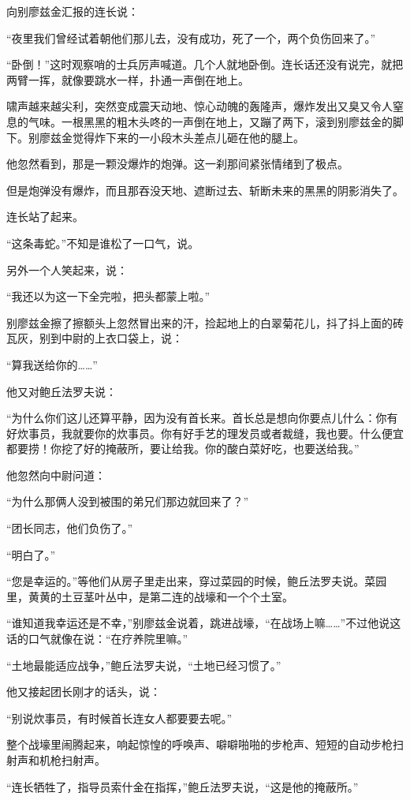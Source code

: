 向别廖兹金汇报的连长说：

“夜里我们曾经试着朝他们那儿去，没有成功，死了一个，两个负伤回来了。”

“卧倒！”这时观察哨的士兵厉声喊道。几个人就地卧倒。连长话还没有说完，就把两臂一挥，就像要跳水一样，扑通一声倒在地上。

啸声越来越尖利，突然变成震天动地、惊心动魄的轰隆声，爆炸发出又臭又令人窒息的气味。一根黑黑的粗木头咚的一声倒在地上，又蹦了两下，滚到别廖兹金的脚下。别廖兹金觉得炸下来的一小段木头差点儿砸在他的腿上。

他忽然看到，那是一颗没爆炸的炮弹。这一刹那间紧张情绪到了极点。

但是炮弹没有爆炸，而且那吞没天地、遮断过去、斩断未来的黑黑的阴影消失了。

连长站了起来。

“这条毒蛇。”不知是谁松了一口气，说。

另外一个人笑起来，说：

“我还以为这一下全完啦，把头都蒙上啦。”

别廖兹金擦了擦额头上忽然冒出来的汗，捡起地上的白翠菊花儿，抖了抖上面的砖瓦灰，别到中尉的上衣口袋上，说：

“算我送给你的……”

他又对鲍丘法罗夫说：

“为什么你们这儿还算平静，因为没有首长来。首长总是想向你要点儿什么：你有好炊事员，我就要你的炊事员。你有好手艺的理发员或者裁缝，我也要。什么便宜都要捞！你挖了好的掩蔽所，要让给我。你的酸白菜好吃，也要送给我。”

他忽然向中尉问道：

“为什么那俩人没到被围的弟兄们那边就回来了？”

“团长同志，他们负伤了。”

“明白了。”

“您是幸运的。”等他们从房子里走出来，穿过菜园的时候，鲍丘法罗夫说。菜园里，黄黄的土豆茎叶丛中，是第二连的战壕和一个个土室。

“谁知道我幸运还是不幸，”别廖兹金说着，跳进战壕，“在战场上嘛……”不过他说这话的口气就像在说：“在疗养院里嘛。”

“土地最能适应战争，”鲍丘法罗夫说，“土地已经习惯了。”

他又接起团长刚才的话头，说：

“别说炊事员，有时候首长连女人都要要去呢。”

整个战壕里闹腾起来，响起惊惶的呼唤声、噼噼啪啪的步枪声、短短的自动步枪扫射声和机枪扫射声。

“连长牺牲了，指导员索什金在指挥，”鲍丘法罗夫说，“这是他的掩蔽所。”

